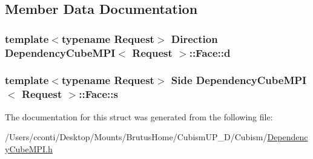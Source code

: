 \subsection{Member Data Documentation}
\hypertarget{struct_dependency_cube_m_p_i_1_1_face_a8ca1f274c00b7e97ab3c327d3236494f}{}
\subsubsection[{d}]{\setlength{\rightskip}{0pt plus 5cm}template$<$typename Request$>$ Direction {\bf Dependency\+Cube\+M\+P\+I}$<$ Request $>$\+::Face\+::d}\label{struct_dependency_cube_m_p_i_1_1_face_a8ca1f274c00b7e97ab3c327d3236494f}
\hypertarget{struct_dependency_cube_m_p_i_1_1_face_a0f93c85a3376303880fc199236b0e3da}{}
\subsubsection[{s}]{\setlength{\rightskip}{0pt plus 5cm}template$<$typename Request$>$ Side {\bf Dependency\+Cube\+M\+P\+I}$<$ Request $>$\+::Face\+::s}\label{struct_dependency_cube_m_p_i_1_1_face_a0f93c85a3376303880fc199236b0e3da}


The documentation for this struct was generated from the following file\+:\begin{DoxyCompactItemize}
\item 
/\+Users/cconti/\+Desktop/\+Mounts/\+Brutus\+Home/\+Cubism\+U\+P\+\_\+D/\+Cubism/\hyperlink{_dependency_cube_m_p_i_8h}{Dependency\+Cube\+M\+P\+I.\+h}\end{DoxyCompactItemize}
